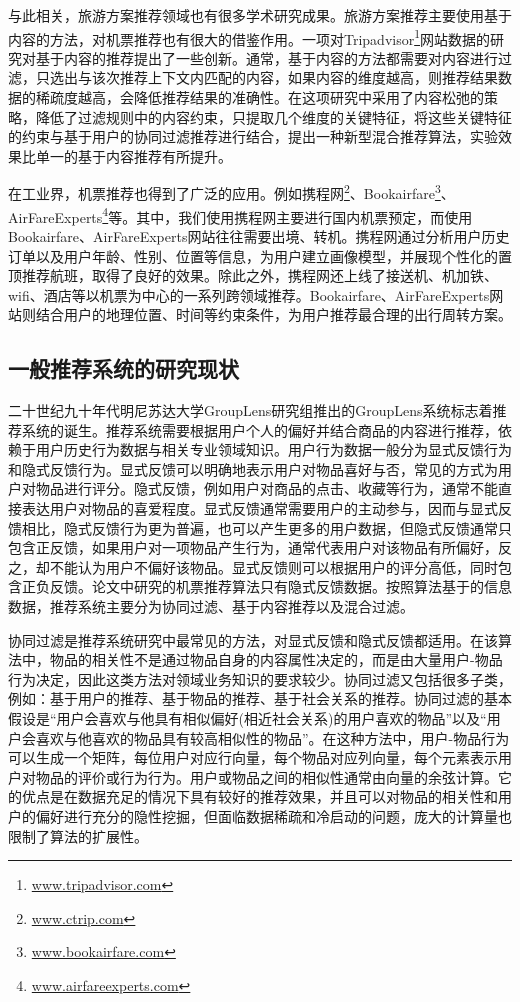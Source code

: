 与此相关，旅游方案推荐领域也有很多学术研究成果。旅游方案推荐主要使用基于内容的方法，对机票推荐也有很大的借鉴作用。一项对Tripadvisor\footnote{\url{www.tripadvisor.com}}网站数据的研究对基于内容的推荐提出了一些创新。通常，基于内容的方法都需要对内容进行过滤，只选出与该次推荐上下文内匹配的内容，如果内容的维度越高，则推荐结果数据的稀疏度越高，会降低推荐结果的准确性。在这项研究中采用了内容松弛的策略，降低了过滤规则中的内容约束，只提取几个维度的关键特征，将这些关键特征的约束与基于用户的协同过滤推荐进行结合，提出一种新型混合推荐算法，实验效果比单一的基于内容推荐有所提升。

在工业界，机票推荐也得到了广泛的应用。例如携程网\footnote{\url{www.ctrip.com}}、Bookairfare\footnote{\url{www.bookairfare.com}}、AirFareExperts\footnote{\url{www.airfareexperts.com}}等。其中，我们使用携程网主要进行国内机票预定，而使用Bookairfare、AirFareExperts网站往往需要出境、转机。携程网通过分析用户历史订单以及用户年龄、性别、位置等信息，为用户建立画像模型，并展现个性化的置顶推荐航班，取得了良好的效果。除此之外，携程网还上线了接送机、机加铁、wifi、酒店等以机票为中心的一系列跨领域推荐。Bookairfare、AirFareExperts网站则结合用户的地理位置、时间等约束条件，为用户推荐最合理的出行周转方案。

\subsection{一般推荐系统的研究现状}

二十世纪九十年代明尼苏达大学GroupLens研究组推出的GroupLens系统\cite{konstan1997grouplens}标志着推荐系统的诞生。推荐系统需要根据用户个人的偏好并结合商品的内容进行推荐，依赖于用户历史行为数据与相关专业领域知识。用户行为数据一般分为显式反馈行为和隐式反馈行为\cite{oard1998implicit,lin2001characterized}。显式反馈可以明确地表示用户对物品喜好与否，常见的方式为用户对物品进行评分。隐式反馈，例如用户对商品的点击、收藏等行为，通常不能直接表达用户对物品的喜爱程度。显式反馈通常需要用户的主动参与，因而与显式反馈相比，隐式反馈行为更为普遍，也可以产生更多的用户数据，但隐式反馈通常只包含正反馈，如果用户对一项物品产生行为，通常代表用户对该物品有所偏好，反之，却不能认为用户不偏好该物品。显式反馈则可以根据用户的评分高低，同时包含正负反馈。论文中研究的机票推荐算法只有隐式反馈数据。按照算法基于的信息数据，推荐系统主要分为协同过滤\cite{breese1998empirical}、基于内容推荐\cite{pazzani1999framework,claypool1999combining}以及混合过滤\cite{soboroff1999combining}。

协同过滤是推荐系统研究中最常见的方法，对显式反馈和隐式反馈都适用。在该算法中，物品的相关性不是通过物品自身的内容属性决定的，而是由大量用户-物品行为决定，因此这类方法对领域业务知识的要求较少。协同过滤又包括很多子类，例如：基于用户的推荐\cite{babu2011implementation}、基于物品的推荐\cite{sarwar2001item,linden2003amazon}、基于社会关系的推荐\cite{asabere2015socially,massa2007trust}。协同过滤的基本假设是“用户会喜欢与他具有相似偏好(相近社会关系)的用户喜欢的物品”以及“用户会喜欢与他喜欢的物品具有较高相似性的物品”。在这种方法中，用户-物品行为可以生成一个矩阵，每位用户对应行向量，每个物品对应列向量，每个元素表示用户对物品的评价或行为行为。用户或物品之间的相似性通常由向量的余弦\cite{goshtasby2012similarity}计算。它的优点是在数据充足的情况下具有较好的推荐效果，并且可以对物品的相关性和用户的偏好进行充分的隐性挖掘，但面临数据稀疏和冷启动的问题，庞大的计算量也限制了算法的扩展性。
		

